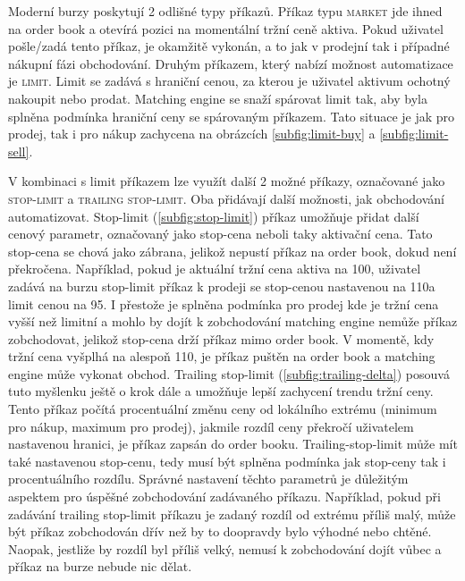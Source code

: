 Moderní burzy poskytují 2 odlišné typy příkazů. Příkaz typu \textsc{market} jde ihned na order book a otevírá pozici na momentální tržní ceně aktiva. Pokud uživatel
pošle/zadá tento příkaz, je okamžitě vykonán, a to jak v prodejní tak i případné nákupní fázi obchodování. Druhým příkazem, který nabízí možnost automatizace
je \textsc{limit}.
Limit se zadává s hraniční cenou, za kterou je uživatel aktivum ochotný nakoupit nebo prodat. Matching engine se snaží spárovat limit tak, aby byla splněna podmínka
hraniční ceny se spárovaným příkazem. Tato situace je jak pro prodej, tak i pro nákup zachycena na obrázcích \ref{subfig:limit-buy} a \ref{subfig:limit-sell}.

V kombinaci s limit příkazem lze využít další 2 možné příkazy, označované jako \textsc{stop-limit} a \textsc{trailing stop-limit}. Oba přidávají další možnosti,
jak obchodování automatizovat. Stop-limit (\ref{subfig:stop-limit}) příkaz umožňuje přidat další cenový parametr, označovaný jako stop-cena neboli taky aktivační cena.
Tato stop-cena se chová jako zábrana, jelikož nepustí příkaz na order book, dokud není překročena. Například, pokud je aktuální tržní cena aktiva na 100\texteuro, uživatel zadává na burzu stop-limit příkaz k
prodeji se stop-cenou nastavenou na 110\texteuro a limit cenou na 95\texteuro. I přestože je splněna podmínka pro prodej kde je tržní cena vyšší než limitní
a mohlo by dojít k zobchodování matching engine nemůže příkaz zobchodovat, jelikož stop-cena drží příkaz mimo order book. V momentě, kdy tržní cena vyšplhá na
alespoň 110\texteuro, je příkaz puštěn na order book a matching engine může vykonat obchod.
Trailing stop-limit (\ref{subfig:trailing-delta}) posouvá tuto myšlenku ještě o krok dále a umožňuje lepší zachycení trendu tržní ceny.
Tento příkaz počítá procentuální změnu ceny od lokálního
extrému (minimum pro nákup, maximum pro prodej), jakmile rozdíl ceny překročí uživatelem nastavenou hranici, je příkaz zapsán do order booku. Trailing-stop-limit
může mít také nastavenou stop-cenu, tedy musí být splněna podmínka jak stop-ceny tak i procentuálního rozdílu.
Správné nastavení těchto parametrů je důležitým aspektem pro úspěšné zobchodování zadávaného příkazu. Například, pokud při zadávání trailing stop-limit příkazu
je zadaný rozdíl od extrému příliš malý, může být příkaz zobchodován dřív než by to doopravdy bylo výhodné nebo chtěné. Naopak, jestliže by rozdíl byl příliš velký,
nemusí k zobchodování dojít vůbec a příkaz na burze nebude nic dělat.



